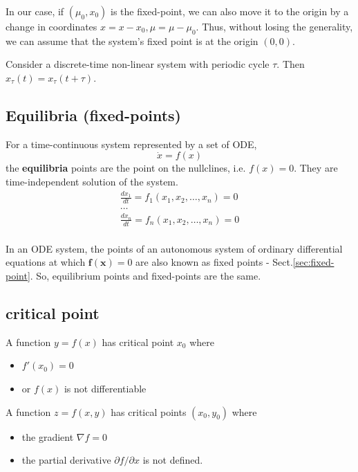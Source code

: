 In our case, if $(\mu_0,x_0)$ is the fixed-point, we can also move it
to the origin by a change in coordinates
$x=x-x_0,\mu=\mu-\mu_0$. Thus, without losing the generality, we can
assume that the system's fixed point is at the origin $(0,0)$.

Consider a discrete-time non-linear system with periodic cycle
$\tau$. Then $x_\tau(t) = x_\tau(t+\tau)$.


\subsection{Equilibria (fixed-points)}
\label{sec:equilibria}

For a time-continuous system represented by a set of ODE,
\begin{equation}
  \label{eq:636}
  \dot{x}=f(x)
\end{equation}
the {\bf equilibria} points are the point on the nullclines,
i.e. $f(x)=0$. They are time-independent solution of the system.
\begin{equation}
\begin{split}
\frac{dx_1}{dt} = f_1 (x_1, x_2, \ldots, x_n) = 0 \\
\ldots \\
\frac{dx_n}{dt} = f_n (x_1, x_2, \ldots, x_n) = 0 \\
\end{split}
\end{equation}


In an ODE system, the points of an autonomous system of ordinary differential
equations at which $\mathbf{f(x)} = 0$ are also known as fixed points -
Sect.\ref{sec:fixed-point}. So, equilibrium points and fixed-points are the same.

\subsection{critical point}
\label{sec:critical-point}

A function $y=f(x)$ has critical point $x_0$ where 
\begin{itemize}
  \item  $f'(x_0) = 0$
  
  \item or $f(x)$ is not differentiable
\end{itemize}


A function $z=f(x,y)$ has critical points $(x_0, y_0)$ where

\begin{itemize}
  \item  the gradient $\nabla f = 0	$
  
  \item the partial derivative $\partial f/ \partial x$ is not defined.
\end{itemize}

